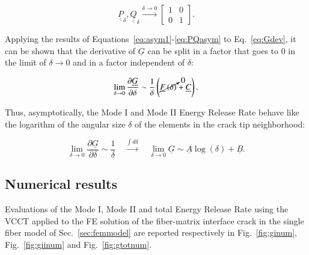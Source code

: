 \documentclass[review]{elsarticle}
\begin{document}
\begin{equation}\label{eq:PQasym}
\underline{\underline{P}}_{\delta},\underline{\underline{Q}}_{\delta}\xrightarrow{\delta\rightarrow 0}\begin{bmatrix}1&0\\0&1\end{bmatrix}.
\end{equation}

Applying the results of Equations~\ref{eq:asym1}-\ref{eq:PQasym} to Eq.~\ref{eq:Gdev}, it can be shown that the derivative of $\underline{G}$ can be split in a factor that goes to $0$ in the limit of $\delta\rightarrow 0$ and in a factor independent of $\delta$:

\begin{equation}
\lim_{\delta\rightarrow 0}\frac{\partial \underline{G}}{\partial \delta}\sim\frac{1}{\delta}\left(\cancelto{0}{\underline{F}\left(\delta\right)}+\underline{C}\right).
\end{equation}

Thus, asymptotically, the Mode I and Mode II Energy Release Rate behave like the logarithm of the angular size $\delta$ of the elements in the crack tip neighborhood:

\begin{equation}
\lim_{\delta\rightarrow 0}\frac{\partial \underline{G}}{\partial \delta}\sim\frac{1}{\delta}\quad\xrightarrow{\int d\delta}\quad\lim_{\delta\rightarrow 0}\underline{G}\sim \underline{A}\log(\delta)+\underline{B}.
\end{equation}

\subsection{Numerical results}

Evaluations of the Mode I, Mode II and total Energy Release Rate using the VCCT applied to the FE solution of the fiber-matrix interface crack in the single fiber model of Sec.~\ref{sec:femmodel} are reported respectively in Fig.~\ref{fig:ginum}, Fig.~\ref{fig:giinum} and Fig.~\ref{fig:gtotnum}.
\end{document}
